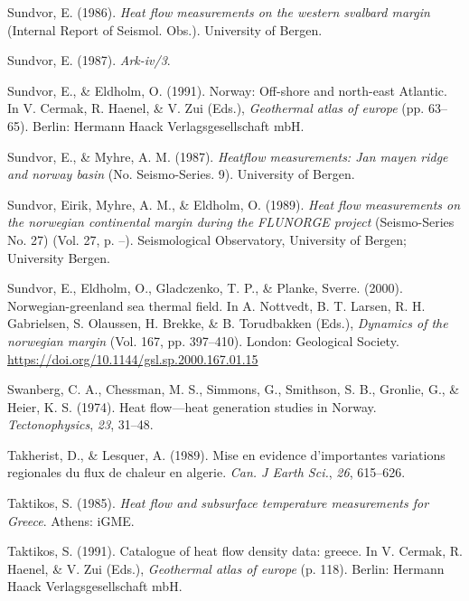 \documentclass[draft,linenumbers]{agujournal2018}
\begin{document}
\leavevmode{}%
Sundvor, E. (1986). \emph{Heat flow measurements on the western svalbard
margin} (Internal Report of Seismol. Obs.). University of Bergen.

\leavevmode{}%
Sundvor, E. (1987). \emph{Ark-iv/3}.

\leavevmode{}%
Sundvor, E., \& Eldholm, O. (1991). Norway: Off-shore and north-east
{Atlantic}. In V. Cermak, R. Haenel, \& V. Zui (Eds.), \emph{Geothermal
atlas of europe} (pp. 63--65). Berlin: Hermann Haack Verlagsgesellschaft
mbH.

\leavevmode{}%
Sundvor, E., \& Myhre, A. M. (1987). \emph{Heatflow measurements: Jan
mayen ridge and norway basin} (No. Seismo-Series. 9). University of
Bergen.

\leavevmode{}%
Sundvor, Eirik, Myhre, A. M., \& Eldholm, O. (1989). \emph{Heat flow
measurements on the norwegian continental margin during the FLUNORGE
project} (Seismo-Series No. 27) (Vol. 27, p. --). Seismological
Observatory, University of Bergen; University Bergen.

\leavevmode{}%
Sundvor, E., Eldholm, O., Gladczenko, T. P., \& Planke, Sverre. (2000).
Norwegian-greenland sea thermal field. In A. Nottvedt, B. T. Larsen, R.
H. Gabrielsen, S. Olaussen, H. Brekke, \& B. Torudbakken (Eds.),
\emph{Dynamics of the norwegian margin} (Vol. 167, pp. 397--410).
London: Geological Society.
\url{https://doi.org/10.1144/gsl.sp.2000.167.01.15}

\leavevmode{}%
Swanberg, C. A., Chessman, M. S., Simmons, G., Smithson, S. B., Gronlie,
G., \& Heier, K. S. (1974). Heat flow---heat generation studies in
{Norway}. \emph{Tectonophysics}, \emph{23}, 31--48.

\leavevmode{}%
Takherist, D., \& Lesquer, A. (1989). Mise en evidence d'importantes
variations regionales du flux de chaleur en algerie. \emph{Can. J Earth
Sci.}, \emph{26}, 615--626.

\leavevmode{}%
Taktikos, S. (1985). \emph{Heat flow and subsurface temperature
measurements for {Greece}}. Athens: iGME.

\leavevmode{}%
Taktikos, S. (1991). Catalogue of heat flow density data: greece. In V.
Cermak, R. Haenel, \& V. Zui (Eds.), \emph{Geothermal atlas of europe}
(p. 118). Berlin: Hermann Haack Verlagsgesellschaft mbH.
\end{document}
